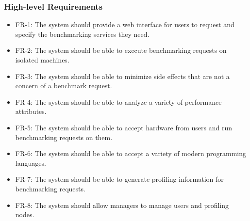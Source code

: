 \documentclass{article}
\begin{document}
    \subsubsection{High-level Requirements}
    	\begin{itemize}
        		\item FR-1: The system should provide a web interface for users to request and specify the benchmarking services they need.
                \item FR-2: The system should be able to execute benchmarking requests on isolated machines. 
                \item FR-3: The system should be able to minimize side effects that are not a concern of a benchmark request. 
                \item FR-4: The system should be able to analyze a variety of performance attributes. 
                \item FR-5: The system should be able to accept hardware from users and run benchmarking requests on them. 
                \item FR-6: The system should be able to accept a variety of modern programming languages. 
                \item FR-7: The system should be able to generate profiling information for benchmarking requests. 
                \item FR-8: The system should allow managers to manage users and profiling nodes. 
        \end{itemize}
            
\end{document}
